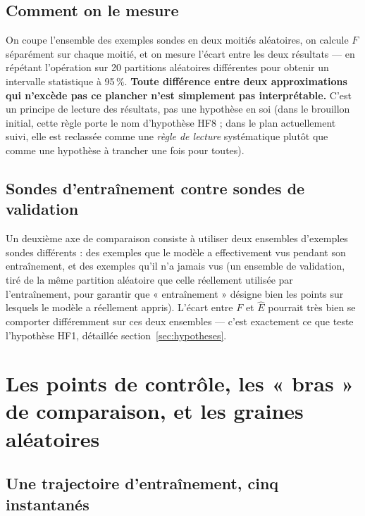 \documentclass[11pt,a4paper]{article}
\begin{document}
\subsection{Comment on le mesure}

On coupe l'ensemble des exemples sondes en deux moitiés aléatoires, on calcule $F$ séparément sur
chaque moitié, et on mesure l'écart entre les deux résultats — en répétant l'opération sur 20
partitions aléatoires différentes pour obtenir un intervalle statistique à 95\,\%. \textbf{Toute
différence entre deux approximations qui n'excède pas ce plancher n'est simplement pas
interprétable.} C'est un principe de lecture des résultats, pas une hypothèse en soi (dans le
brouillon initial, cette règle porte le nom d'hypothèse HF8 ; dans le plan actuellement suivi, elle
est reclassée comme une \emph{règle de lecture} systématique plutôt que comme une hypothèse à
trancher une fois pour toutes).

\subsection{Sondes d'entraînement contre sondes de validation}

Un deuxième axe de comparaison consiste à utiliser deux ensembles d'exemples sondes différents : des
exemples que le modèle a effectivement vus pendant son entraînement, et des exemples qu'il n'a
jamais vus (un ensemble de validation, tiré de la même partition aléatoire que celle réellement
utilisée par l'entraînement, pour garantir que « entraînement » désigne bien les points sur lesquels
le modèle a réellement appris). L'écart entre $F$ et $\hat E$ pourrait très bien se comporter
différemment sur ces deux ensembles — c'est exactement ce que teste l'hypothèse HF1, détaillée
section~\ref{sec:hypotheses}.

\section{Les points de contrôle, les « bras » de comparaison, et les graines aléatoires}
\label{sec:checkpoints}

\subsection{Une trajectoire d'entraînement, cinq instantanés}
\end{document}
